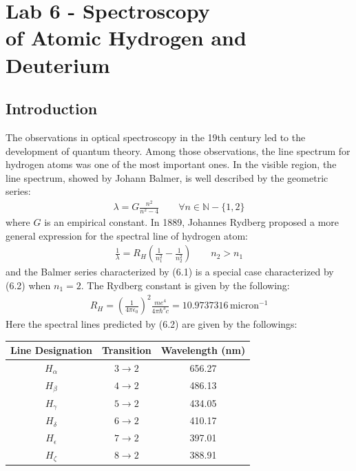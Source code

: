 \documentclass[11pt]{book}
\theoremstyle{break}
\theoremstyle{break}
\newcommand{\N}{\mathbb{N}}
\begin{document}
\newpage
\tableofcontents
{}


\setcounter{chapter}{6}
\chapter*{Lab 6 - Spectroscopy \\of Atomic Hydrogen and Deuterium }
\section{Introduction}
The observations in optical spectroscopy in the 19th century led to the development of quantum theory. Among those observations, the line spectrum for hydrogen atoms was one of the most important ones. In the visible region, the line spectrum, showed by Johann Balmer, is well described by the geometric series:
\begin{align}
\lambda = G \frac{n^2}{n^2 - 4} \qquad \forall	 n \in \N - \{1,2\}
\end{align}
where $G$ is an empirical constant. In 1889, Johannes Rydberg proposed a more general expression for the spectral line of hydrogen atom:
\begin{align}
\frac{1}{\lambda} = R_H \left( \frac{1}{n_1^2} - \frac{1}{n_2^2}\right) \qquad n_2 > n_1 
\end{align}
and the Balmer series characterized by (6.1) is a special case characterized by (6.2) when $n_1 = 2$. The Rydberg constant is given by the following:
\begin{align}
R_H = \left( \frac{1}{4\pi \epsilon_0}\right)^2 \frac{me^4}{4\pi \hbar^3 c} = 10.9737316 \,\text{micron}^{-1}
\end{align}
Here the spectral lines predicted by (6.2) are given by the followings:
\begin{center}
\begin{tabular}{|c|c|c|}
\hline
Line Designation & Transition & Wavelength (nm) \\
\hline 
$H_\alpha$ & $3\to 2$ & 656.27 \\
\hline
$H_\beta$ & $4\to 2$ & 486.13 \\
\hline
$H_\gamma$ & $5\to 2$ & 434.05 \\
\hline
$H_\delta$ & $6\to 2$ & 410.17 \\
\hline
$H_\epsilon$ & $7\to 2$ & 397.01 \\
\hline
$H_\zeta$ & $8\to 2$ & 388.91 \\
\hline
\end{tabular}
\end{center}
\end{document}
